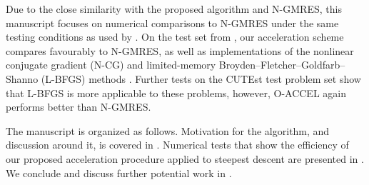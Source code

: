 \documentclass[main.tex]{subfiles}
\begin{document}
Due to the close similarity with the proposed algorithm and N-GMRES,
this manuscript focuses on numerical comparisons to N-GMRES under the
same testing conditions as used by \citet{sterck2013steepest}. On the
test set from \citet{sterck2013steepest}, our acceleration scheme
compares favourably to N-GMRES, as well as implementations of the
nonlinear conjugate gradient (N-CG) and limited-memory
Broyden--Fletcher--Goldfarb--Shanno (L-BFGS) methods
\citep{nocedal2006numerical}.  Further tests on the CUTEst test
problem set \citep{gould2015cutest} show that L-BFGS is more
applicable to these problems, however, O-ACCEL again performs better
than N-GMRES.

The manuscript is organized as follows. Motivation for the algorithm,
and discussion around it, is covered in .
Numerical tests that show the efficiency of our proposed acceleration
procedure applied to steepest descent are presented in
. We conclude and discuss further potential
work in .
\end{document}
